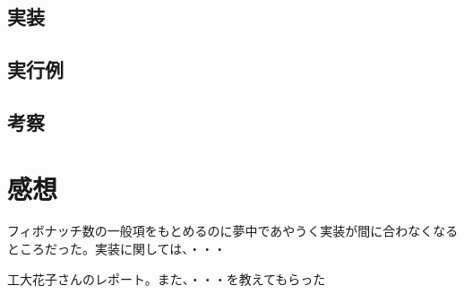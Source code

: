 \documentclass{jarticle}
\begin{document}
\subsection{実装}

\subsection{実行例}

\subsection{考察}

\section{感想}
フィボナッチ数の一般項をもとめるのに夢中であやうく実装が間に合わなくなるところだった。実装に関しては、・・・


\begin{thebibliography}{99}

 工大花子さんのレポート。また、・・・を教えてもらった 

\end{thebibliography}
\end{document}
